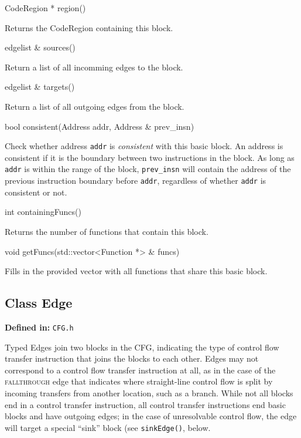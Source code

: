 \documentclass{article}
\newenvironment{apient}{\small\verbatim}{\endverbatim}
\newcommand{\apidesc}[1]{%
{\addtolength{\leftskip}{4em}%
#1\par\medskip}
}
\newcommand{\definedin}[1]{%
\textbf{Defined in:} \texttt{#1}
}
\begin{document}
\begin{apient}
CodeRegion * region()
\end{apient}
\apidesc{Returns the CodeRegion containing this block.}

\begin{apient}
edgelist & sources()
\end{apient}
\apidesc{Return a list of all incomming edges to the block.}

\begin{apient}
edgelist & targets()
\end{apient}
\apidesc{Return a list of all outgoing edges from the block.}

\begin{apient}
bool consistent(Address addr, Address & prev_insn)
\end{apient}
\apidesc{Check whether address \texttt{addr} is \emph{consistent} with this basic block. An address is consistent if it is the boundary between two instructions in the block. As long as \texttt{addr} is within the range of the block, \texttt{prev\_insn} will contain the address of the previous instruction boundary before \texttt{addr}, regardless of whether \texttt{addr} is consistent or not.}

\begin{apient}
int containingFuncs()
\end{apient}
\apidesc{Returns the number of functions that contain this block.}

\begin{apient}
void getFuncs(std::vector<Function *> & funcs)
\end{apient}
\apidesc{Fills in the provided vector with all functions that share this basic block.}

\subsection{Class Edge}

\definedin{CFG.h}

Typed Edges join two blocks in the CFG, indicating the type of control flow
transfer instruction that joins the blocks to each other. Edges may not correspond
to a control flow transfer instruction at all, as in the case of the {\scshape
fallthrough} edge that indicates where straight-line control flow is split by
incoming transfers from another location, such as a branch. While not all
blocks end in a control transfer instruction, all control transfer instructions
end basic blocks and have outgoing edges; in the case of unresolvable control
flow, the edge will target a special ``sink'' block (see \texttt{sinkEdge()},
below.
\end{document}
